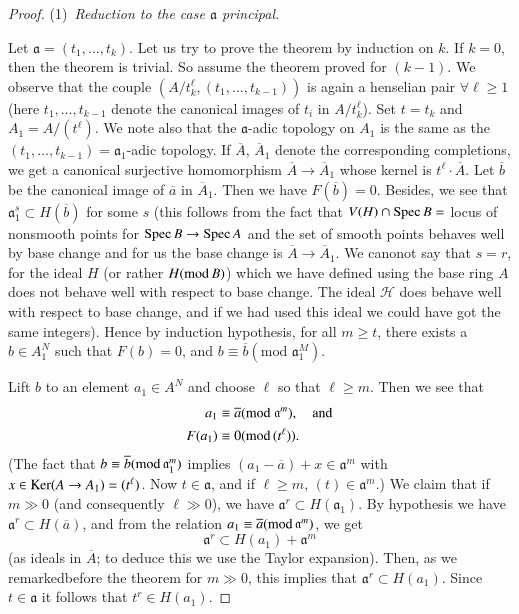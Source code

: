 \begin{proof}
(1)~{\em Reduction to the case $\mathfrak{a}$ principal.}

Let $\mathfrak{a}=(t_{1},\ldots,t_{k})$. Let us try to prove the
theorem by induction on $k$. If $k=0$, then the theorem is trivial. So
assume the theorem proved for $(k-1)$. We observe that the couple
$(A/t^{\ell}_{k},(t_{1},\ldots,t_{k-1}))$ is again a henselian pair
$\forall \ell \geq 1$ (here $t_{1},\ldots,t_{k-1}$ denote the
canonical images of $t_{i}$ in $A/t^{\ell}_{k}$). Set\pageoriginale
$t=t_{k}$ and $A_{1}=A/(t^{\ell})$. We note also that the
$\mathfrak{a}$-adic topology on $A_{1}$ is the same as the
$(t_{1},\ldots,t_{k-1})=\mathfrak{a}_{1}$-adic topology. If
$\overline{A}$, $\overline{A}_{1}$ denote the corresponding
completions, we get a canonical surjective homomorphism
$\overline{A}\to \overline{A}_{1}$ whose kernel is $t^{\ell}\cdot
\overline{A}$. Let $\overline{b}$ be the canonical image of
$\overline{a}$ in $\overline{A}_{1}$. Then we have
$F(\overline{b})=0$. Besides, we see that $\mathfrak{a}^{s}_{1}\subset
H(\overline{b})$ for some $s$ (this follows from the fact that
$V(H)\cap \operatorname{Spec} B=$ locus of nonsmooth points for $\operatorname{Spec} B\to \operatorname{Spec} A$
and the set of smooth points behaves well by base change and for us
the base change is $\overline{A}\to \overline{A}_{1}$. We canonot say
that $s=r$, for the ideal $H$ (or rather $H(\text{mod\,}B)$) which we
have defined using the base ring $A$ does not behave well with respect
to base change. The ideal $\mathscr{H}$ does behave well with respect
to base change, and if we had used this ideal we could have got the
same integers). Hence by induction hypothesis, for all $m\geq t$,
there exists a $b\in A^{N}_{1}$ such that $F(b)=0$, and $b\equiv
\overline{b}(\text{mod~}\mathfrak{a}^{M}_{1})$. 

Lift $b$ to an element $a_{1}\in A^{N}$ and choose $\ell$ so that
$\ell \geq m$. Then we see that
\begin{align*}
a_{1} &\equiv
\overline{a}(\text{mod~}\mathfrak{a}^{m}),\quad\text{and}\\
F(a_{1}) &\equiv 0(\text{mod\,}(t^{\ell})).
\end{align*}
(The fact that $b\equiv
\overline{b}(\text{mod\,}\mathfrak{a}^{m}_{1})$ implies
$(a_{1}-\overline{a})+x\in\mathfrak{a}^{m}$ with $x\in \operatorname{Ker} (A\to
A_{1})=(t^{\ell})$. Now $t\in \mathfrak{a}$, and if $\ell\geq m$,
$(t)\in \mathfrak{a}^{m}$.) We claim that if $m\gg 0$ (and
consequently $\ell \gg 0$), we have $\mathfrak{a}^{r}\subset
H(\mathfrak{a}_{1})$. By hypothesis we have $\mathfrak{a}^{r}\subset
H(\overline{a})$, and from the relation $a_{1}\equiv
\overline{a}(\text{mod\,}\mathfrak{a}^{m})$, we get
$$
\mathfrak{a}^{r}\subset H(a_{1})+\mathfrak{a}^{m}
$$
(as ideals in $\overline{A}$; to deduce this we use the Taylor
expansion). Then, as we remarked\pageoriginale before the theorem for
$m\gg 0$, this implies that $\mathfrak{a}^{r}\subset H(a_{1})$. Since
$t\in \mathfrak{a}$ it follows that $t^{r}\in H(a_{1})$. 


\end{proof}
